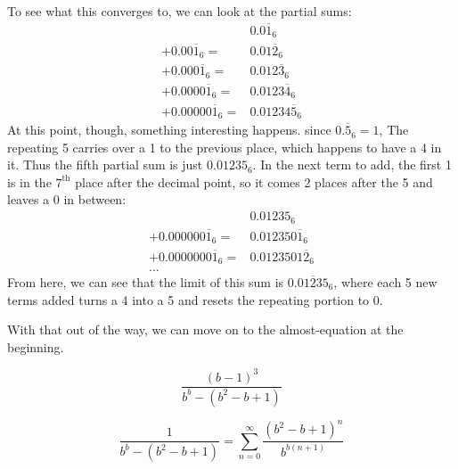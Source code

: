 \documentclass{article}
\begin{document}
To see what this converges to, we can look at the partial sums:
\begin{align*}
  & 0.0\overline{1}_6 \\
  + 0.00\overline{1}_6 =& 0.01\overline{2}_6 \\
  + 0.000\overline{1}_6 =& 0.012\overline{3}_6 \\
  + 0.0000\overline{1}_6 =& 0.0123\overline{4}_6 \\
  + 0.00000\overline{1}_6 =& 0.01234\overline{5}_6
\end{align*}
At this point, though, something interesting happens.
since $0.\overline{5}_6=1$,
The repeating 5 carries over a 1 to the previous place,
which happens to have a 4 in it.
Thus the fifth partial sum is just $0.01235_6$.
In the next term to add,
the first 1 is in the $7^\text{th}$ place after the decimal point,
so it comes 2 places after the 5 and leaves a 0 in between:
\begin{align*}
  & 0.01235_6 \\
  + 0.000000\overline{1}_6 =& 0.012350\overline{1}_6 \\
  + 0.0000000\overline{1}_6 =& 0.0123501\overline{2}_6 \\
  \ldots &
\end{align*}
From here, we can see that the limit of this sum is
$0.\overline{01235}_6$,
where each 5 new terms added turns a 4 into a 5
and resets the repeating portion to 0.

With that out of the way, we can move on to the almost-equation at the beginning.

\[\frac{(b-1)^3}{b^b-(b^2-b+1)}\]

\[\frac{1}{b^b-(b^2-b+1)} = \sum_{n=0}^\infty \frac{(b^2-b+1)^n}{b^{b(n+1)}} \]
\end{document}
